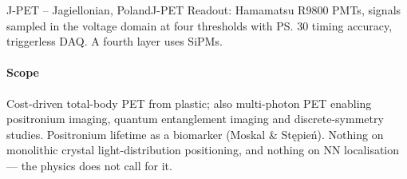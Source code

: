 \begin{programnote}{J-PET -- Jagiellonian, Poland}{J-PET}
Readout: Hamamatsu R9800 PMTs, signals sampled in the voltage domain at four
thresholds with \ps{30} timing accuracy, triggerless DAQ. A fourth layer uses
SiPMs.
 
\paragraph{Scope}
Cost-driven total-body PET from plastic; also multi-photon PET enabling
positronium imaging, quantum entanglement imaging and discrete-symmetry studies.
Positronium lifetime as a biomarker (Moskal \& Stępień). Nothing on monolithic
crystal light-distribution positioning, and nothing on NN localisation ---
the physics does not call for it.
 
 
\end{programnote}
 
 
 
